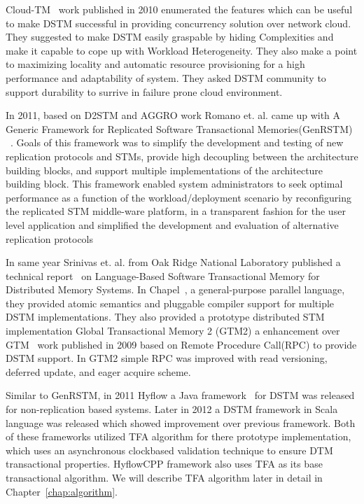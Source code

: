 \documentclass[12pt,english]{report}
\begin{document}
Cloud-TM~\cite{Romano:2010:CHC:1773912.1773914} work published in 2010 enumerated the features which can be useful to make DSTM successful in providing concurrency solution over network cloud. They suggested to make DSTM easily graspable by hiding Complexities and make it capable to cope up with Workload Heterogeneity. They also make a point to maximizing locality and automatic resource provisioning for a high performance and adaptability of system. They asked DSTM community to support durability to surrive in failure prone cloud environment. 

In 2011, based on D2STM and AGGRO work Romano et. al. came up with A Generic Framework for Replicated Software Transactional Memories(GenRSTM) ~\cite{GenRSTM:6038614}. Goals of this framework was to simplify the development and testing of new replication protocols and STMs, provide high decoupling between the architecture building blocks, and support multiple implementations of the architecture building block. This framework enabled system administrators to seek optimal performance as a function of the workload/deployment scenario by reconfiguring the replicated STM middle-ware platform, in a transparent fashion for the
user level application and simplified the development and evaluation of alternative replication protocols

In same year Srinivas et. al. from Oak Ridge National Laboratory published a technical report~\cite{sridharan2011scalable} on Language-Based Software Transactional Memory for Distributed Memory Systems. In Chapel~\cite{chapel:Language}, a general-purpose parallel language, they provided atomic semantics and pluggable compiler support for multiple DSTM implementations. They also provided a prototype distributed STM implementation Global Transactional Memory 2 (GTM2) a enhancement over GTM~\cite{sridharan2009scalable} work published in 2009 based on Remote Procedure Call(RPC) to provide DSTM  support. In GTM2 simple RPC was improved with read versioning, deferred update, and eager acquire scheme.

Similar to GenRSTM, in 2011 Hyflow a Java framework~\cite{Saad:2011:HHP:1996130.1996167} for DSTM was released for non-replication based systems. Later in 2012 a DSTM framework in Scala language was released which showed improvement over previous framework. Both of these frameworks utilized TFA algorithm for there prototype implementation, which uses an asynchronous clockbased validation technique to ensure DTM transactional properties. HyflowCPP framework also uses TFA as its base transactional algorithm. We will describe TFA algorithm later in detail in Chapter~\ref{chap:algorithm}.
\end{document}
